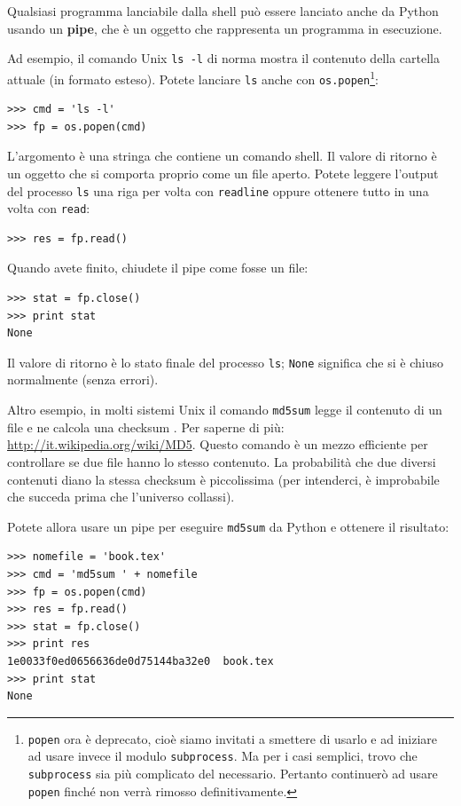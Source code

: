 \documentclass[10pt]{book}
\begin{document}
Qualsiasi programma lanciabile dalla shell può essere lanciato anche da Python usando un {\bf pipe}, che è un oggetto che rappresenta un programma in esecuzione.

Ad esempio, il comando Unix {\tt ls -l} di norma mostra il contenuto della cartella attuale (in formato esteso). Potete lanciare {\tt ls} anche con {\tt os.popen}\footnote{{\tt popen} ora è deprecato, cioè siamo invitati a smettere di usarlo e ad iniziare ad usare invece il modulo {\tt subprocess}. Ma per i casi semplici, trovo che
{\tt subprocess} sia più complicato del necessario. Pertanto continuerò ad usare {\tt popen} finché non verrà rimosso definitivamente.}:

\begin{verbatim}
>>> cmd = 'ls -l'
>>> fp = os.popen(cmd)
\end{verbatim}
%
L'argomento è una stringa che contiene un comando shell. Il valore di ritorno è un oggetto che si comporta proprio come un file aperto. Potete leggere l'output del processo {\tt ls} una riga per volta con {\tt readline} oppure ottenere tutto in una volta con {\tt read}:

\begin{verbatim}
>>> res = fp.read()
\end{verbatim}
%
Quando avete finito, chiudete il pipe come fosse un file:

\begin{verbatim}
>>> stat = fp.close()
>>> print stat
None
\end{verbatim}
%
Il valore di ritorno è lo stato finale del processo {\tt ls};
{\tt None} significa che si è chiuso normalmente (senza errori).

Altro esempio, in molti sistemi Unix il comando {\tt md5sum}
legge il contenuto di un file e ne calcola una checksum . Per saperne di più: \url{http://it.wikipedia.org/wiki/MD5}.  Questo comando è un mezzo efficiente per controllare se due file hanno lo stesso contenuto. La probabilità che due diversi contenuti diano la stessa checksum è piccolissima (per intenderci, è improbabile che succeda prima che l'universo collassi).

Potete allora usare un pipe per eseguire {\tt md5sum} da Python e ottenere il risultato:

\begin{verbatim}
>>> nomefile = 'book.tex'
>>> cmd = 'md5sum ' + nomefile
>>> fp = os.popen(cmd)
>>> res = fp.read()
>>> stat = fp.close()
>>> print res
1e0033f0ed0656636de0d75144ba32e0  book.tex
>>> print stat
None
\end{verbatim}
\end{document}

